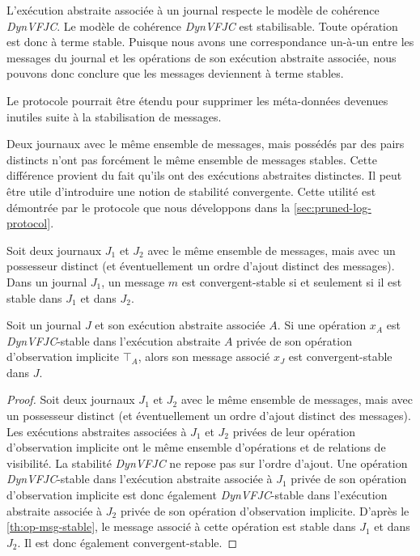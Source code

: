 L'exécution abstraite associée à un journal respecte le modèle de cohérence \emph{DynVFJC}.
Le modèle de cohérence \emph{DynVFJC} est stabilisable.
Toute opération est donc à terme stable.
Puisque nous avons une correspondance un-à-un entre les messages du journal et les opérations de son exécution abstraite associée, nous pouvons donc conclure que les messages deviennent à terme stables.

Le protocole pourrait être étendu pour supprimer les méta-données devenues inutiles suite à la stabilisation de messages.

Deux journaux avec le même ensemble de messages, mais possédés par des pairs distincts n'ont pas forcément le même ensemble de messages stables.
Cette différence provient du fait qu'ils ont des exécutions abstraites distinctes.
Il peut être utile d'introduire une notion de stabilité convergente.
Cette utilité est démontrée par le protocole que nous développons dans la \autoref{sec:pruned-log-protocol}.

\begin{definition}\label{def:msg-conv-stable}
Soit deux journaux $J_1$ et $J_2$ avec le même ensemble de messages, mais avec un possesseur distinct (et éventuellement un ordre d'ajout distinct des messages).
Dans un journal $J_1$, un message $m$ est convergent-stable si et seulement si il est stable dans $J_1$ et dans $J_2$.
\end{definition}

\begin{theorem}
Soit un journal $J$ et son exécution abstraite associée $A$.
Si une opération $x_A$ est \emph{DynVFJC}-stable dans l'exécution abstraite $A$ privée de son opération d'observation implicite $\top_A$, alors son message associé $x_J$ est convergent-stable dans $J$.
\end{theorem}

\begin{proof}
Soit deux journaux $J_1$ et $J_2$ avec le même ensemble de messages, mais avec un possesseur distinct (et éventuellement un ordre d'ajout distinct des messages).
Les exécutions abstraites associées à $J_1$ et $J_2$ privées de leur opération d'observation implicite ont le même ensemble d'opérations et de relations de visibilité.
La stabilité \emph{DynVFJC} ne repose pas sur l'ordre d'ajout.
Une opération \emph{DynVFJC}-stable dans l'exécution abstraite associée à $J_1$ privée de son opération d'observation implicite est donc également \emph{DynVFJC}-stable dans l'exécution abstraite associée à $J_2$ privée de son opération d'observation implicite.
D'après le \autoref{th:op-msg-stable}, le message associé à cette opération est stable dans $J_1$ et dans $J_2$.
Il est donc également convergent-stable.
\end{proof}

